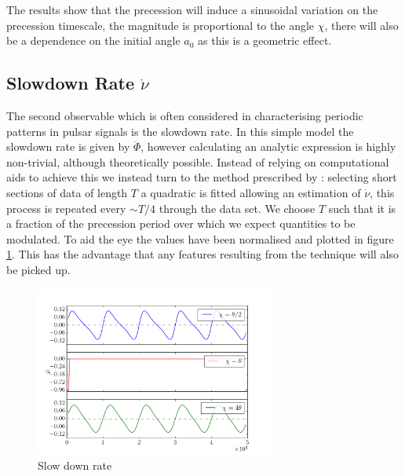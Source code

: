 \documentclass[11pt]{article}
\numberwithin{equation}{section}
\numberwithin{figure}{section}
\numberwithin{table}{section}
\begin{document}
The results show that the precession will induce a sinusoidal variation on the precession timescale, the magnitude is proportional to the angle $\chi$, there will also be a dependence on the initial angle $a_{0}$ as this is a geometric effect.

\subsection{Slowdown Rate $\dot{\nu}$}
The second observable which is often considered in characterising periodic patterns in pulsar signals is the slowdown rate. In this simple model the slowdown rate is given by $\ddot{\Phi}$, however calculating an analytic expression is highly non-trivial, although theoretically possible. Instead of relying on computational aids to achieve this we instead turn to the method prescribed by \citet{Lyne2010}: selecting short sections of data of length $T$ a quadratic is fitted allowing an estimation of $\dot{\nu}$, this process is repeated every $\sim T/4$ through the data set. We choose $T$ such that it is a fraction of the precession period over which we expect quantities to be modulated. To aid the eye the values have been normalised and plotted in figure \ref{fig:nu_dot no torque}. This has the advantage that any features resulting from the technique will also be picked up.
\begin{figure}[ht]
\centering
	\includegraphics[width=0.7\textwidth]{nu_dot_no_torque.pdf}
\caption{Slow down rate }
\label{fig:nu_dot no torque}
\end{figure}
\end{document}
